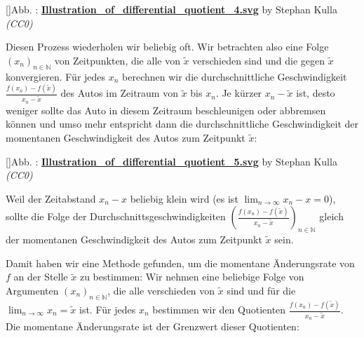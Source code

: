 \documentclass[fontsize=9pt,
               parskip=half-,
               DIV=14,
               listof=chapterentry,
               tocflat]{scrbook}
\newcounter{imagelabel}
\begin{document}
[]{Abb. : \protect\href{https://commons.wikimedia.org/wiki/File:Illustration_of_differential_quotient_4.svg}{\textbf{Illustration\allowbreak\_of\allowbreak\_differential\allowbreak\_quotient\allowbreak\_4.svg}} by Stephan Kulla \textit{(CC0)}}\begin{center}
\end{center}

Diesen Prozess wiederholen wir beliebig oft. Wir betrachten also eine Folge $(x_{n})_{n\in \mathbb {N} }$ von Zeitpunkten, die alle von ${\tilde {x}}$ verschieden sind und die gegen ${\tilde {x}}$ konvergieren. Für jedes $x_{n}$ berechnen wir die durchschnittliche Geschwindigkeit ${\tfrac {f(x_{n})-f({\tilde {x}})}{x_{n}-{\tilde {x}}}}$ des Autos im Zeitraum von ${\tilde {x}}$ bis $x_{n}$. Je kürzer $x_{n}-{\tilde {x}}$ ist, desto weniger sollte das Auto in diesem Zeitraum beschleunigen oder abbremsen können und umso mehr entspricht dann die durchschnittliche Geschwindigkeit der momentanen Geschwindigkeit des Autos zum Zeitpunkt ${\tilde {x}}$:

[]{Abb. : \protect\href{https://commons.wikimedia.org/wiki/File:Illustration_of_differential_quotient_5.svg}{\textbf{Illustration\allowbreak\_of\allowbreak\_differential\allowbreak\_quotient\allowbreak\_5.svg}} by Stephan Kulla \textit{(CC0)}}\begin{center}
\end{center}

Weil der Zeitabstand $x_{n}-x$ beliebig klein wird (es ist $\lim _{n\to \infty }x_{n}-x=0$), sollte die Folge der Durchschnittsgeschwindigkeiten $\left({\tfrac {f(x_{n})-f({\tilde {x}})}{x_{n}-{\tilde {x}}}}\right)_{n\in \mathbb {N} }$ gleich der momentanen Geschwindigkeit des Autos zum Zeitpunkt ${\tilde {x}}$ sein.

Damit haben wir eine Methode gefunden, um die momentane Änderungsrate von $f$ an der Stelle ${\tilde {x}}$ zu bestimmen: Wir nehmen eine beliebige Folge von Argumenten $(x_{n})_{n\in \mathbb {N} }$, die alle verschieden von ${\tilde {x}}$ sind und für die $\lim _{n\to \infty }x_{n}={\tilde {x}}$ ist. Für jedes $x_{n}$ bestimmen wir den Quotienten ${\tfrac {f(x_{n})-f({\tilde {x}})}{x_{n}-{\tilde {x}}}}$. Die momentane Änderungsrate ist der Grenzwert dieser Quotienten:
\end{document}
